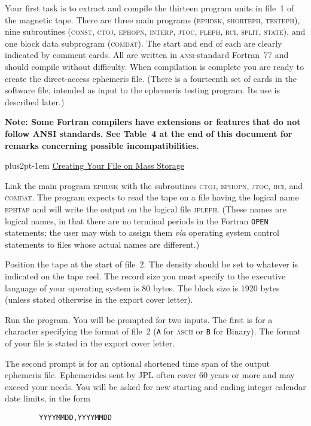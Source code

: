 \documentclass[twoside,11pt]{article}
\renewcommand{\_}{\texttt{\symbol{95}}}
\newcommand{\hdg}[1]{\vskip4pt plus2pt\leavevmode\kern-1em \underline{\large{#1}}\par}
\newcommand{\hdg}[1]{\subsection*{{#1}}}
\begin{document}
Your first task is to extract and compile the thirteen program
units in file~1 of the magnetic tape. There are three main programs
(\textsc{ephdsk, shorteph, testeph}), nine subroutines (\textsc{const,
ctoj, ephopn, interp, jtoc, pleph, rci, split, state}), and one block
data subprogram (\textsc{comdat}).  The start and end of each are clearly
indicated by comment cards. All are written in \textsc{ansi}-standard
Fortran~77 and should compile without difficulty. When compilation
is complete you are ready to create the direct-access ephemeris file.
(There is a fourteenth set of cards in the software file, intended as
input to the ephemeris testing program. Its use is described later.)

\textbf{Note: Some Fortran compilers have extensions or features that
do not follow ANSI standards. See Table~4 at the end of this document
for remarks concerning possible incompatibilities.}


\hdg{Creating Your File on Mass Storage}

Link the main program \textsc{ephdsk} with the subroutines \textsc{ctoj, ephopn,
jtoc, rci}, and \textsc{comdat}. The program expects to read the tape on a
file having the logical name \textsc{ephtap} and will write the output on the
logical file \textsc{jpleph}. (These names are logical names, in that there
are no terminal periods in the Fortran {\tt OPEN} statements; the user
may wish to assign them \emph{via} operating system control
statements to files whose actual names are different.)

Position the tape at the start of file~2.
The density should be set to whatever is indicated
on the tape reel. The record size you must specify to the
executive language of your operating system is 80 bytes. The
block size is 1920 bytes (unless stated otherwise in the export
cover letter).

Run the program.  You will be prompted for two inputs.  The first is for
a character specifying the format of file~2 ({\tt A} for \textsc{ascii}
or {\tt B} for Binary). The format of your file is stated in the export
cover letter.

The second prompt is for an optional shortened time span of the output
ephemeris file. Ephemerides sent by JPL often cover 60 years or more and
may exceed your needs.  You will be asked for new starting and ending
integer calendar date limits, in the form

\begin{verbatim}
        YYYYMMDD,YYYYMMDD
\end{verbatim}
\end{document}
